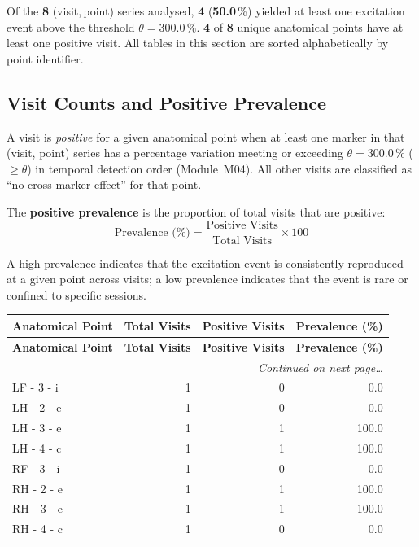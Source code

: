 \documentclass[a4paper,11pt]{article}
\begin{document}
\noindent
Of the \textbf{8} (visit,\,point) series analysed,
\textbf{4} (\textbf{50.0}\,\%) yielded at least one
excitation event above the threshold $\theta = 300.0\,\%$.
\textbf{4} of \textbf{8} unique anatomical points
have at least one positive visit.
All tables in this section are sorted alphabetically by point identifier.

\subsection{Visit Counts and Positive Prevalence}

A visit is \emph{positive} for a given anatomical point when at least one marker in that
(visit, point) series has a percentage variation meeting or exceeding
$\theta = 300.0\,\%$ ($\geq \theta$) in temporal detection order (Module~M04).
All other visits are classified as ``no cross-marker effect'' for that point.

The \textbf{positive prevalence} is the proportion of total visits that are positive:
\[
  \text{Prevalence (\%)} = \frac{\text{Positive Visits}}{\text{Total Visits}} \times 100
\]

A high prevalence indicates that the excitation event is consistently reproduced at a given
point across visits; a low prevalence indicates that the event is rare or confined to
specific sessions.

\begin{small}
\begin{longtable}{p{5cm}rrr}
\toprule
\textbf{Anatomical Point} &
\textbf{Total Visits} &
\textbf{Positive Visits} &
\textbf{Prevalence (\%)} \\
\midrule
\endfirsthead
\toprule
\textbf{Anatomical Point} &
\textbf{Total Visits} &
\textbf{Positive Visits} &
\textbf{Prevalence (\%)} \\
\midrule
\endhead
\midrule
\multicolumn{4}{r}{\small\emph{Continued on next page\ldots}} \\
\endfoot
\bottomrule
\endlastfoot
LF - 3 - i & 1 & 0 & 0.0 \\
LH - 2 - e & 1 & 0 & 0.0 \\
LH - 3 - e & 1 & 1 & 100.0 \\
LH - 4 - c & 1 & 1 & 100.0 \\
RF - 3 - i & 1 & 0 & 0.0 \\
RH - 2 - e & 1 & 1 & 100.0 \\
RH - 3 - e & 1 & 1 & 100.0 \\
RH - 4 - c & 1 & 0 & 0.0 \\
\end{longtable}
\end{small}
\end{document}

